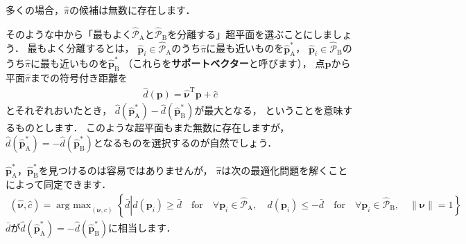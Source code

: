 ﻿\documentclass[a4paper]{jsarticle}
\begin{document}
多くの場合，$\hat{\pi}$の候補は無数に存在します．
\begin{figure}[h]
\centering

\end{figure}
そのような中から「最もよく$\hat{\mathcal{P}}_{\mathrm{A}}$と$\hat{\mathcal{P}}_{\mathrm{B}}$を分離する」超平面を選ぶことにしましょう．
最もよく分離するとは，
$\hat{\bm{p}}_{i}\in\hat{\mathcal{P}}_{\mathrm{A}}$のうち$\hat{\pi}$に最も近いものを$\hat{\bm{p}}_{\mathrm{A}}^{*}$，
$\hat{\bm{p}}_{i}\in\hat{\mathcal{P}}_{\mathrm{B}}$のうち$\hat{\pi}$に最も近いものを$\hat{\bm{p}}_{\mathrm{B}}^{*}$
（これらを{\bf サポートベクター}と呼びます），
点$\bm{p}$から平面$\hat{\pi}$までの符号付き距離を
\begin{align*}
\hat{d}(\bm{p})=\hat{\bm{\nu}}^{\mathrm{T}}\bm{p}+\hat{c}
\end{align*}
とそれぞれおいたとき，
$\hat{d}(\hat{\bm{p}}_{\mathrm{A}}^{*})-\hat{d}(\hat{\bm{p}}_{\mathrm{B}}^{*})$が最大となる，
ということを意味するものとします．
このような超平面もまた無数に存在しますが，
$\hat{d}(\hat{\bm{p}}_{\mathrm{A}}^{*})=-\hat{d}(\hat{\bm{p}}_{\mathrm{B}}^{*})$となるものを選択するのが自然でしょう．
\begin{figure}[h]
\centering

\end{figure}

$\hat{\bm{p}}_{\mathrm{A}}^{*}$，$\hat{\bm{p}}_{\mathrm{B}}^{*}$を見つけるのは容易ではありませんが，
$\hat{\pi}$は次の最適化問題を解くことによって同定できます．
\begin{align*}
(\hat{\bm{\nu}},\hat{c})=\mathop{\mathrm{arg~max}}_{(\bm{\nu},c)}\left\{
\bar{d}\left|
d(\bm{p}_{i})\geq \bar{d}\quad\mbox{for}\quad\forall\bm{p}_{i}\in\hat{\mathcal{P}}_{\mathrm{A}},\quad
d(\bm{p}_{i})\leq-\bar{d}\quad\mbox{for}\quad\forall\bm{p}_{i}\in\hat{\mathcal{P}}_{\mathrm{B}},\quad
\|\bm{\nu}\|=1
\right.\right\}
\end{align*}
$\bar{d}$が$\hat{d}(\hat{\bm{p}}_{\mathrm{A}}^{*})=-\hat{d}(\hat{\bm{p}}_{\mathrm{B}}^{*})$に相当します．
\end{document}
